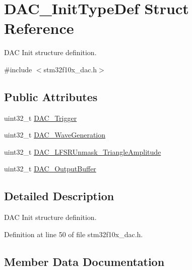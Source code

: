 \hypertarget{struct_d_a_c___init_type_def}{}\section{D\+A\+C\+\_\+\+Init\+Type\+Def Struct Reference}
\label{struct_d_a_c___init_type_def}


D\+AC Init structure definition.  




{\ttfamily \#include $<$stm32f10x\+\_\+dac.\+h$>$}

\subsection*{Public Attributes}
\begin{DoxyCompactItemize}
\item 
uint32\+\_\+t \hyperlink{struct_d_a_c___init_type_def_a7b26ebaeb51a0157a781f7de8ba779e5}{D\+A\+C\+\_\+\+Trigger}
\item 
uint32\+\_\+t \hyperlink{struct_d_a_c___init_type_def_a6753e78ddd2dc8273444ba01a272d63a}{D\+A\+C\+\_\+\+Wave\+Generation}
\item 
uint32\+\_\+t \hyperlink{struct_d_a_c___init_type_def_a27ed27a544d50781b20d59cc55e6cef8}{D\+A\+C\+\_\+\+L\+F\+S\+R\+Unmask\+\_\+\+Triangle\+Amplitude}
\item 
uint32\+\_\+t \hyperlink{struct_d_a_c___init_type_def_ad3e9e01486443e99f19e65a446b03ca6}{D\+A\+C\+\_\+\+Output\+Buffer}
\end{DoxyCompactItemize}


\subsection{Detailed Description}
D\+AC Init structure definition. 

Definition at line 50 of file stm32f10x\+\_\+dac.\+h.



\subsection{Member Data Documentation}
\mbox{\label{struct_d_a_c___init_type_def_a27ed27a544d50781b20d59cc55e6cef8}} 

